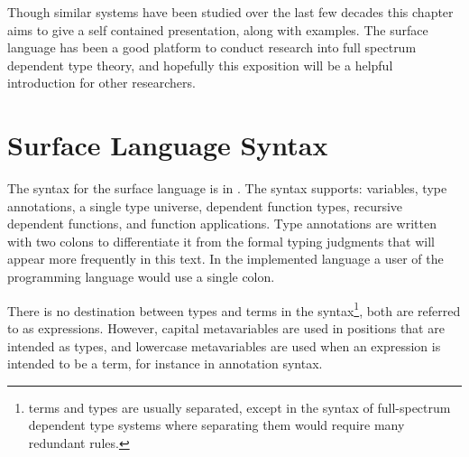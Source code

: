 Though similar systems have been studied over the last few decades this chapter aims to give a self contained presentation, along with examples.
The surface language has been a good platform to conduct research into full spectrum dependent type theory, and hopefully this exposition will be a helpful introduction for other researchers.

\section{Surface Language Syntax}

The syntax for the surface language is in .
The syntax supports: variables, type annotations, a single type universe, dependent function types, recursive dependent functions, and function applications.
Type annotations are written with two colons to differentiate it from the formal typing judgments that will appear more frequently in this text.
In the implemented language a user of the programming language would use a single colon.

There is no destination between types and terms in the syntax\footnote{
  terms and types are usually separated, except in the syntax of full-spectrum dependent type systems where separating them would require many redundant rules.
  }, both are referred to as expressions.
However, capital metavariables are used in positions that are intended as types, and lowercase metavariables are used when an expression is intended to be a term, for instance in annotation syntax.



